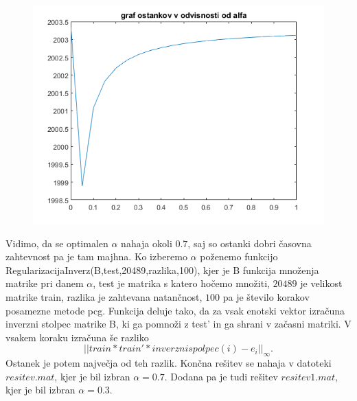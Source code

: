\documentclass[11pt]{article} %
\begin{document}
\begin{figure}[ht]
\centering
\begin{minipage}{.5\textwidth}
\centering
\includegraphics[scale=0.5]{ostanek}
\end{minipage}%
\end{figure}


Vidimo, da se optimalen $\alpha$ nahaja okoli $0.7$, saj so ostanki dobri časovna zahtevnost pa je tam majhna. Ko izberemo $\alpha$ poženemo funkcijo RegularizacijaInverz(B,test,20489,razlika,100), kjer je B funkcija množenja matrike pri danem $\alpha$, test je matrika s katero hočemo množiti, $20489$ je velikost matrike train, razlika je zahtevana natančnost, $100$ pa je število korakov posamezne metode pcg. Funkcija deluje tako, da za vsak enotski vektor izračuna inverzni stolpec matrike B, ki ga pomnoži z test' in ga shrani v začasni matriki. V vsakem koraku izračuna še razliko
$$||train*train'*inverznispolpec(i) - e_i||_{\infty}.$$
Ostanek je potem največja od teh razlik. Končna rešitev se nahaja v datoteki $resitev.mat$, kjer je bil izbran $\alpha=0.7$. Dodana pa je tudi rešitev $resitev1.mat$, kjer je bil izbran $\alpha=0.3$.
\end{document}
